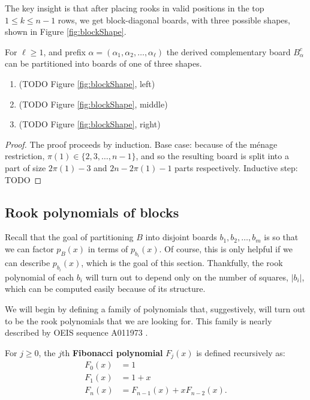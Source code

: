 The key insight is that after placing rooks in valid positions in
the top $1 \leq k \leq n-1$ rows, we get block-diagonal boards,
with three possible shapes, shown in Figure \ref{fig:blockShape}.
\begin{lemma}
  For $\ell \geq 1$, and prefix $\alpha = (\alpha_1, \alpha_2, \dots, \alpha_\ell)$
  the derived complementary board $B_\alpha^c$ can be partitioned into boards
  of one of three shapes.
  \begin{enumerate}
    \item (TODO Figure \ref{fig:blockShape}, left)
    \item (TODO Figure \ref{fig:blockShape}, middle)
    \item (TODO Figure \ref{fig:blockShape}, right)
  \end{enumerate}
\end{lemma}
\begin{proof}
  The proof proceeds by induction.
  Base case:
  because of the m\'enage restriction, $\pi(1) \in \{2, 3, \dots, n-1\}$,
  and so the resulting board is split into a part of size
  $2\pi(1) - 3$ and $2n - 2\pi(1) - 1$ parts respectively.
  Inductive step: TODO
\end{proof}



\subsection{Rook polynomials of blocks}
Recall that the goal of partitioning $B$ into disjoint boards $b_1, b_2, \dots, b_m$
is so that we can factor $p_B(x)$ in terms of $p_{b_i}(x)$. Of course, this is
only helpful if we can describe $p_{b_i}(x)$, which is the goal of this section.
Thankfully, the rook polynomial of each $b_i$ will turn out to depend only on the
number of squares, $|b_i|$, which can be computed easily because of its structure.

We will begin by defining a family of polynomials that, suggestively, will turn
out to be the rook polynomials that we are looking for. This family is nearly
described by OEIS sequence A011973 \cite{oeis}.
\begin{definition}
  For $j \geq 0$, the $j$th \textbf{Fibonacci polynomial} $F_{j}(x)$ is defined recursively as:
  \begin{align}
    F_0(x) &= 1 \\
    F_1(x) &= 1 + x \\
    F_n(x) &= F_{n-1}(x) + xF_{n-2}(x).
  \end{align}
\end{definition}

